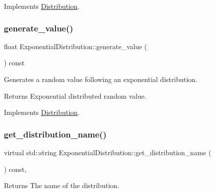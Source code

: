 Implements \hyperlink{classDistribution_a0778c93fb686dd1abe2830e1c7e564a6}{Distribution}.

\mbox{\label{classExponentialDistribution_aab3b68ba1f724307b74108ac96f92357}} 
\subsubsection{\texorpdfstring{generate\+\_\+value()}{generate\_value()}}
{\footnotesize\ttfamily float Exponential\+Distribution\+::generate\+\_\+value (\begin{DoxyParamCaption}{ }\end{DoxyParamCaption}) const\hspace{0.3cm}{\ttfamily [virtual]}}

Generates a random value following an exponential distribution. \begin{DoxyReturn}{Returns}
Exponential distributed random value. 
\end{DoxyReturn}


Implements \hyperlink{classDistribution_aa1ea89994ac123f003b8b8f5fe6fad40}{Distribution}.

\mbox{\label{classExponentialDistribution_a98ac6f2df798ae19bc371a2f071e21bb}} 
\subsubsection{\texorpdfstring{get\+\_\+distribution\+\_\+name()}{get\_distribution\_name()}}
{\footnotesize\ttfamily virtual std\+::string Exponential\+Distribution\+::get\+\_\+distribution\+\_\+name (\begin{DoxyParamCaption}{ }\end{DoxyParamCaption}) const\hspace{0.3cm}{\ttfamily [inline]}, {\ttfamily [virtual]}}

\begin{DoxyReturn}{Returns}
The name of the distribution. 
\end{DoxyReturn}


